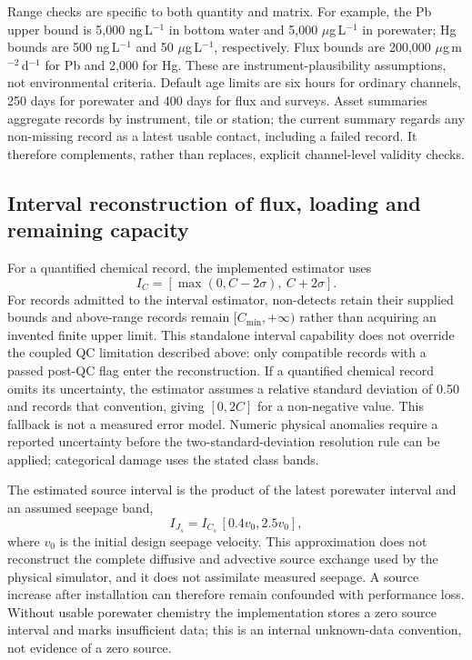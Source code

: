 Range checks are specific to both quantity and matrix. For example, the Pb upper bound is 5,000 ng\,L$^{-1}$ in bottom water and 5,000 $\mu$g\,L$^{-1}$ in porewater; Hg bounds are 500 ng\,L$^{-1}$ and 50 $\mu$g\,L$^{-1}$, respectively. Flux bounds are 200,000 $\mu$g\,m$^{-2}$\,d$^{-1}$ for Pb and 2,000 for Hg. These are instrument-plausibility assumptions, not environmental criteria. Default age limits are six hours for ordinary channels, 250 days for porewater and 400 days for flux and surveys. Asset summaries aggregate records by instrument, tile or station; the current summary regards any non-missing record as a latest usable contact, including a failed record. It therefore complements, rather than replaces, explicit channel-level validity checks.

\subsection{Interval reconstruction of flux, loading and remaining capacity}

For a quantified chemical record, the implemented estimator uses
\begin{equation}
I_C=[\max(0,C-2\sigma),\ C+2\sigma].
\end{equation}
For records admitted to the interval estimator, non-detects retain their supplied bounds and above-range records remain $[C_{\min},+\infty)$ rather than acquiring an invented finite upper limit. This standalone interval capability does not override the coupled QC limitation described above: only compatible records with a passed post-QC flag enter the reconstruction. If a quantified chemical record omits its uncertainty, the estimator assumes a relative standard deviation of 0.50 and records that convention, giving $[0,2C]$ for a non-negative value. This fallback is not a measured error model. Numeric physical anomalies require a reported uncertainty before the two-standard-deviation resolution rule can be applied; categorical damage uses the stated class bands.

The estimated source interval is the product of the latest porewater interval and an assumed seepage band,
\begin{equation}
I_{J_s}=I_{C_s}\,[0.4v_0,2.5v_0],
\label{eq:estimated-source}
\end{equation}
where $v_0$ is the initial design seepage velocity. This approximation does not reconstruct the complete diffusive and advective source exchange used by the physical simulator, and it does not assimilate measured seepage. A source increase after installation can therefore remain confounded with performance loss. Without usable porewater chemistry the implementation stores a zero source interval and marks insufficient data; this is an internal unknown-data convention, not evidence of a zero source.

